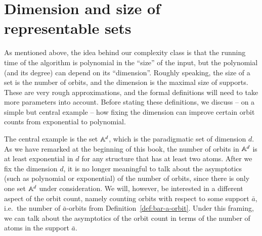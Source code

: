 \section{Dimension and size of representable sets}
\label{sec:dimension-and-size}
As mentioned above, the idea behind our complexity class is that the running time of the algorithm is polynomial in the ``size'' of the input, but the polynomial (and its degree) can depend on its ``dimension''. Roughly speaking, the size of a set is the number of orbits, and the dimension is the maximal size of supports. These are very rough approximations, and the formal definitions will need to take more parameters into account. Before stating these definitions, we discuss -- on a simple but central example -- how fixing the dimension can improve certain orbit counts from exponential to polynomial.

The central example is the set $\mathbb A^d$, which is the paradigmatic set of  dimension $d$.  
 As we have remarked at the beginning of this book, the number of orbits in $\mathbb A^d$ is at least exponential in $d$ for any structure that has at least two atoms. After we fix the dimension $d$, it is no longer meaningful to talk about the asymptotics (such as polynomial or exponential) of the number of orbits, since there is only one set $\mathbb A^d$ under consideration.  We will, however, be interested in a different aspect of the orbit count, namely counting  orbits with respect to some support $\bar a$, i.e.~the number of  $\bar a$-orbits from
Definition~\ref{def:bar-a-orbit}. Under this framing, we can talk about the asymptotics of the orbit count in terms of the number of atoms in the support $\bar a$.

